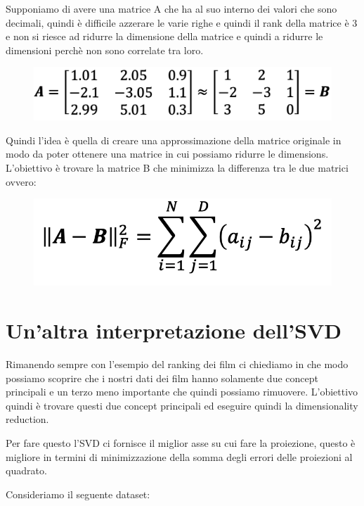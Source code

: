 \documentclass[14pt]{extreport}
\begin{document}
Supponiamo di avere una matrice A che ha al suo interno dei valori che sono decimali, quindi è difficile azzerare le varie righe e quindi il rank
della matrice è 3 e non si riesce ad ridurre la dimensione della matrice e quindi a ridurre le dimensioni perchè non sono correlate tra loro.

\begin{figure}[H]
	\centering
	\includegraphics[width=0.7\linewidth]{501.jpeg}
\end{figure}

Quindi l'idea è quella di creare una approssimazione della matrice originale in modo da poter ottenere una matrice in cui possiamo ridurre le
dimensions. L'obiettivo è trovare la matrice B che minimizza la differenza tra le due matrici ovvero:

\begin{figure}[H]
	\centering
	\includegraphics[width=0.7\linewidth]{502.jpeg}
\end{figure}

\section{Un'altra interpretazione dell'SVD}

Rimanendo sempre con l'esempio del ranking dei film ci chiediamo in che modo possiamo scoprire che i nostri dati dei film hanno solamente due concept
principali e un terzo meno importante che quindi possiamo rimuovere. L'obiettivo quindi è trovare questi due concept principali ed eseguire quindi la
dimensionality reduction.

Per fare questo l'SVD ci fornisce il miglior asse su cui fare la proiezione, questo è migliore in termini di minimizzazione della somma degli errori
delle proiezioni al quadrato.

Consideriamo il seguente dataset:
\end{document}
